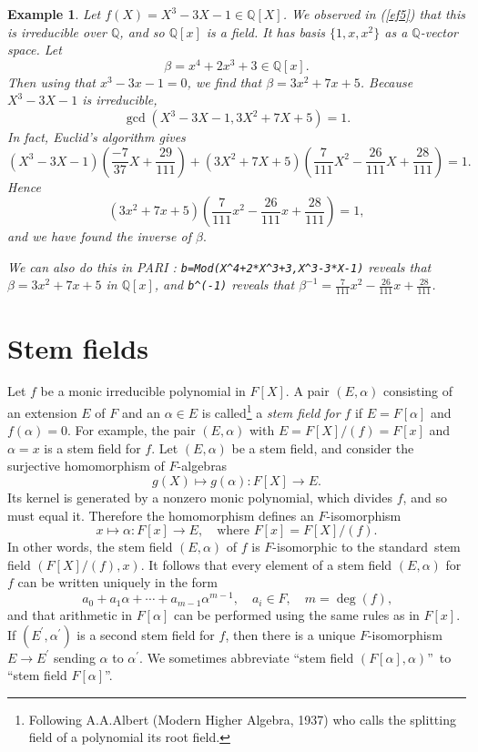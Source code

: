 \documentclass[a4paper,11pt,final,openany]{memoir}
\newtheorem{example}[X]{Example}
\theoremstyle{nonumberplain}
\begin{document}
\begin{example}
\label{ef12}Let $f(X)=X^{3}-3X-1\in\mathbb{Q}[X]$. We observed in (\ref{ef5})
that this is irreducible over $\mathbb{Q}$, and so $\mathbb{Q}{}[x]$ is a
field. It has basis $\{1,x,x^{2}\}$ as a $\mathbb{Q}$-vector space. Let
\[
\beta=x^{4}+2x^{3}+3\in\mathbb{Q}[x].
\]
Then using that $x^{3}-3x-1=0$, we find that $\beta=3x^{2}+7x+5$. Because
$X^{3}-3X-1$ is irreducible,
\[
\gcd(X^{3}-3X-1,3X^{2}+7X+5)=1.
\]
In fact, Euclid's algorithm gives
\[
\textstyle(X^{3}-3X-1)\left(  \frac{-7}{37}X+\frac{29}{111}\right)
+(3X^{2}+7X+5)\left(  \frac{7}{111}X^{2}-\frac{26}{111}X+\frac{28}%
{111}\right)  =1.
\]
Hence
\[
\textstyle(3x^{2}+7x+5)\left(  \frac{7}{111}x^{2}-\frac{26}{111}x+\frac
{28}{111}\right)  =1,
\]
and we have found the inverse of $\beta.$

We can also do this in PARI%
%
: \verb|b=Mod(X^4+2*X^3+3,X^3-3*X-1)| reveals that $\beta=3x^{2}+7x+5$ in
$\mathbb{Q}[x]$, and \verb|b^(-1)| reveals that $\beta^{-1}=\frac{7}{111}%
x^{2}-\frac{26}{111}x+\frac{28}{111}$.
\end{example}

\section{Stem fields}

\label{sf}

Let $f$ be a monic irreducible polynomial in $F[X]$. A pair $(E,\alpha)$
consisting of an extension $E$ of $F$ and an $\alpha\in E$ is
called\footnote{Following A.A.\thinspace Albert (Modern Higher Algebra, 1937)
who calls the splitting field of a polynomial its root field.} a%
\emph{stem field for} $f$ if $E=F[\alpha]$ and $f(\alpha)=0$. For example, the
pair $(E,\alpha)$ with $E=F[X]/(f)=F[x]$ and $\alpha=x$ is a stem field for
$f$. Let $(E,\alpha)$ be a stem field, and consider the surjective
homomorphism of $F$-algebras%
\[
g(X)\mapsto g(\alpha)\colon F[X]\rightarrow E\text{.}%
\]
Its kernel is generated by a nonzero monic polynomial, which divides $f$, and
so must equal it. Therefore the homomorphism defines an $F$-isomorphism%
\[
x\mapsto\alpha\colon F[x]\rightarrow E,\quad\text{where }F[x]=F[X]/(f)\text{.}%
\]
In other words, the stem field $(E,\alpha)$ of $f$ is $F$-isomorphic to the
standard\ stem field $(F[X]/(f),x)$. It follows that every element of a stem
field $(E,\alpha)$ for $f$ can be written uniquely in the form%
\[
a_{0}+a_{1}\alpha+\cdots+a_{m-1}\alpha^{m-1},\quad a_{i}\in F,\quad
m=\deg(f)\text{,}%
\]
and that arithmetic in $F[\alpha]$ can be performed using the same rules as in
$F[x]$. If $(E^{\prime},\alpha^{\prime})$ is a second stem field for $f$, then
there is a unique $F$-isomorphism $E\rightarrow E^{\prime}$ sending $\alpha$
to $\alpha^{\prime}$. We sometimes abbreviate \textquotedblleft stem field
$(F[\alpha],\alpha)$\textquotedblright\ to \textquotedblleft stem field
$F[\alpha]$\textquotedblright.
\end{document}
